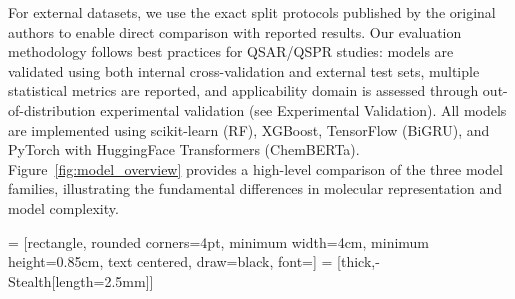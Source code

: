 For external datasets, we use the exact split protocols published by the original authors to enable direct comparison with reported results.
Our evaluation methodology follows best practices for QSAR/QSPR studies\cite{tropsha2006best, cherkasov2014qsar}: models are validated using both internal cross-validation and external test sets, multiple statistical metrics are reported, and applicability domain is assessed through out-of-distribution experimental validation (see Experimental Validation).
All models are implemented using scikit-learn\cite{pedregosa2011scikit} (RF), XGBoost\cite{chen2016xgboost}, TensorFlow\cite{abadi2016tensorflow} (BiGRU), and PyTorch with HuggingFace Transformers (ChemBERTa).
Figure~\ref{fig:model_overview} provides a high-level comparison of the three model families, illustrating the fundamental differences in molecular representation and model complexity.


 = [rectangle, rounded corners=4pt, minimum width=4cm, minimum height=0.85cm, text centered, draw=black, font=\small]
 = [thick,-{Stealth[length=2.5mm]}]

